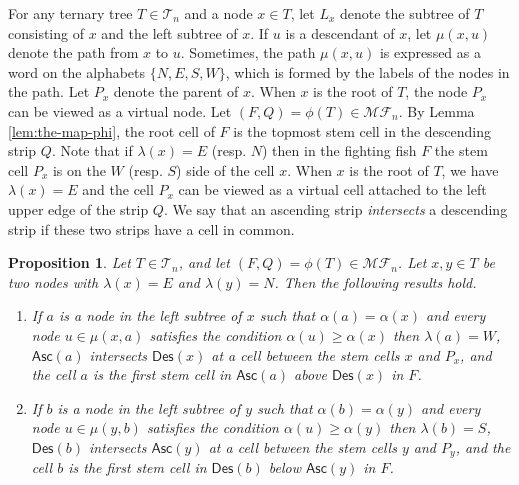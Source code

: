 \documentclass[a4paper,11pt,reqno]{amsart}
\newtheorem{pro}[lem]{Proposition}
\theoremstyle{definition}
\numberwithin{equation}{section}
\newcommand{\Des}{{\textsf{Des}}}
\newcommand{\Asc}{{\textsf{Asc}}}
\newcommand{\MF}{{\mathcal{MF}}}
\newcommand{\T}{{\mathcal{T}}}
\begin{document}
For any ternary tree $T\in\T_n$ and a node $x\in T$, let $L_x$ denote the subtree of $T$ consisting of $x$ and the left subtree of $x$. If $u$ is a descendant of $x$, let $\mu(x,u)$ denote the path from $x$ to $u$. Sometimes, the path $\mu(x,u)$ is expressed as a word on the alphabets $\{N,E,S,W\}$, which is formed by the labels of the nodes in the path. Let $P_x$ denote the parent of $x$. When $x$ is the root of $T$, the node $P_x$ can be viewed as a virtual node. Let $(F,Q)=\phi(T)\in\MF_n$. By Lemma \ref{lem:the-map-phi}, the root cell of $F$ is the topmost stem cell in the descending strip $Q$.
Note that if $\lambda(x)=E$ (resp. $N$) then in the fighting fish $F$ the stem cell $P_x$ is on the $W$ (resp. $S$) side of the cell $x$. When $x$ is the root of $T$, we have $\lambda(x)=E$ and the cell $P_x$ can be viewed as a virtual cell attached to the left upper edge of the strip $Q$. We say that an ascending strip \emph{intersects} a descending strip if these two strips have a cell in common.



\begin{pro} \label{pro:path} Let $T\in\T_n$, and let $(F,Q)=\phi(T)\in\MF_n$. Let $x, y\in T$ be two nodes with $\lambda(x)=E$ and $\lambda(y)=N$.  Then the following results hold.
\begin{enumerate}
\item If $a$ is a node in the left subtree of $x$ such that $\alpha(a)=\alpha(x)$ and every node $u\in\mu(x,a)$ satisfies the condition $\alpha(u)\ge \alpha(x)$ then $\lambda(a)=W$, $\Asc(a)$ intersects $\Des(x)$ at a cell between the stem cells $x$ and $P_x$, and the cell $a$ is the first stem cell in $\Asc(a)$ above $\Des(x)$ in $F$. 
\item If $b$ is a node in the left subtree of $y$ such that $\alpha(b)=\alpha(y)$ and every node $u\in\mu(y,b)$ satisfies the condition $\alpha(u)\ge \alpha(y)$ then $\lambda(b)=S$, $\Des(b)$ intersects $\Asc(y)$ at a cell between the stem cells $y$ and $P_y$, and the cell $b$ is the first stem cell in $\Des(b)$ below $\Asc(y)$ in $F$.
\end{enumerate}
\end{pro}
\end{document}
